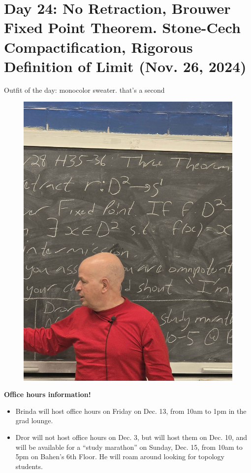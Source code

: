 \section{Day 24: No Retraction, Brouwer Fixed Point Theorem. Stone-Cech Compactification, Rigorous Definition of Limit (Nov. 26, 2024)}
Outfit of the day: monocolor sweater. that's a second
\begin{figure}[h]
    \centering
    \includegraphics[scale=0.1]{MAT327 Notes/Dror Shirts/dror day 24 shirt.jpg}
\end{figure}

\noindent \textbf{Office hours information!}
\begin{itemize}
    \item Brinda will host office hours on Friday on Dec. 13, from 10am to 1pm in the grad lounge.
    \item Dror will not host office hours on Dec. 3, but will host them on Dec. 10, and will be available for a ``study marathon'' on Sunday, Dec. 15, from 10am to 5pm on Bahen's 6th Floor. He will roam around looking for topology students.
\end{itemize}

